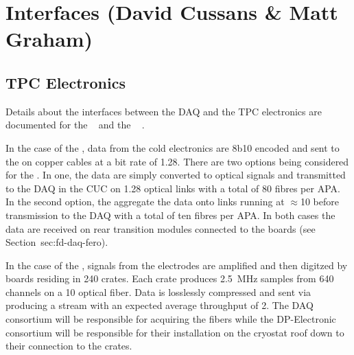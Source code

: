 
\section{Interfaces (David Cussans \& Matt Graham)}
\label{sec:fd-daq-intfc}



\subsection{TPC Electronics}
\label{sec:fd-daq-intfc-elec}

Details about the interfaces between the DAQ and the TPC electronics
are documented for the ~\cite{docdb6742} and the
~\cite{docdb6778} .

In the case of the  , data from the cold
electronics  are 8b10 encoded and sent to the
 on copper cables at a bit rate of \SI{1.28}{\Gbps}. There
are two options being considered for the . In one, the
data are simply converted to optical signals and transmitted to the
DAQ in the CUC on \SI{1.28}{\Gbps} optical links with a total of 80
fibres per APA. In the second option, the  aggregate the
data onto links running at $\approx$\SI{10}{\Gbps} before transmission
to the DAQ with a total of ten fibres per APA. In both cases the data
are received on rear transition modules connected to the 
 boards (see Section~{sec:fd-daq-fero}).

In the case of the  , signals from the
 electrodes are amplified and then digitzed by 
boards residing in 240  crates. 
Each crate produces \SI{2.5}{\MHz} samples from 640 channels on a
\SI{10}{\Gbps} optical fiber. 
Data is losslessly compressed and sent via  producing a
stream with an expected average throughput of \SI{2}{\Gbps}.
The DAQ consortium will be responsible for acquiring the fibers while
the DP-Electronic consortium will be responsible for their
installation on the cryostat roof down to their connection to the
 crates.


